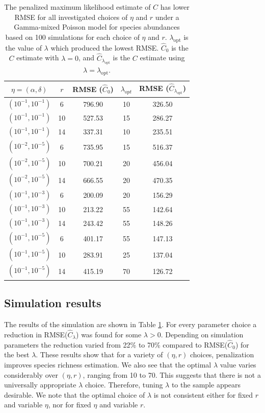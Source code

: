 \documentclass[12pt]{article}
\theoremstyle{break}
\theoremstyle{break}
\begin{document}
\begin{table}[h]
\caption{The penalized maximum likelihood estimate of $C$ has lower RMSE for all investigated choices of $\eta$ and $r$ under a Gamma-mixed Poisson model for species abundances based on 100 simulations for each choice of $\eta$ and $r$.
$\lambda_{\text{opt}}$ is the value of $\lambda$ which produced the lowest RMSE.
$\widehat{C}_0$ is the $C$ estimate with $\lambda = 0$, and $\widehat{C}_{\lambda_{\text{opt}}}$ is the $C$ estimate using $\lambda = \lambda_{\text{opt}}$.
\label{tab:fixed_lambda_results}}
\centering
\begin{tabular}{ccccc}
  \hline
$\eta = (\alpha, \delta)$ & $r$ & RMSE ($\widehat{C}_{0}$) & $\lambda_{opt}$ & RMSE ($\widehat{C}_{\lambda_{ \text{opt}}}$) \\
  \hline
$\left(10^{-1}, 10^{-1}\right)$ &   6 & 796.90 &  10 & 326.50 \\
$\left(10^{-1}, 10^{-1}\right)$ &  10 & 527.53 &  15 & 286.27 \\
  $\left(10^{-1}, 10^{-1}\right)$ &  14 & 337.31 &  10 & 235.51 \\
  $\left(10^{-2}, 10^{-5}\right)$ &   6 & 735.95 &  15 & 516.37 \\
  $\left(10^{-2}, 10^{-5}\right)$ &  10 & 700.21 &  20 & 456.04 \\
  $\left(10^{-2}, 10^{-5}\right)$ &  14 & 666.55 &  20 & 470.35 \\
  $\left(10^{-1}, 10^{-3}\right)$ &   6 & 200.09 &  20 & 156.29 \\
  $\left(10^{-1}, 10^{-3}\right)$ &  10 & 213.22 &  55 & 142.64 \\
  $\left(10^{-1}, 10^{-3}\right)$ &  14 & 243.42 &  55 & 148.26 \\
  $\left(10^{-1}, 10^{-5}\right)$ &   6 & 401.17 &  55 & 147.13 \\
  $\left(10^{-1}, 10^{-5}\right)$ &  10 & 283.91 &  25 & 137.04 \\
  $\left(10^{-1}, 10^{-5}\right)$ &  14 & 415.19 &  70 & 126.72 \\
   \hline
\end{tabular}
\end{table}

\subsection{Simulation results} \label{sec:first_sim}

The results of the simulation are shown in Table \ref{tab:fixed_lambda_results}.  For every parameter choice a reduction in RMSE($\widehat{C}_{\lambda}$) was found for some $\lambda > 0$.  Depending on simulation parameters the reduction varied from 22\% to 70\% compared to RMSE($\widehat{C}_{0}$) for the best $\lambda$.  These results show that for a variety of $(\eta, r)$ choices, penalization improves species richness estimation.
We also see that the optimal $\lambda$ value varies considerably over $(\eta, r)$, ranging from 10 to 70.  This suggests that there is not a universally appropriate $\lambda$ choice. Therefore, tuning $\lambda$ to the sample appears desirable. We note that the optimal choice of $\lambda$ is not consistent either for fixed $r$ and variable $\eta$, nor for fixed $\eta$ and variable $r$.
\end{document}
